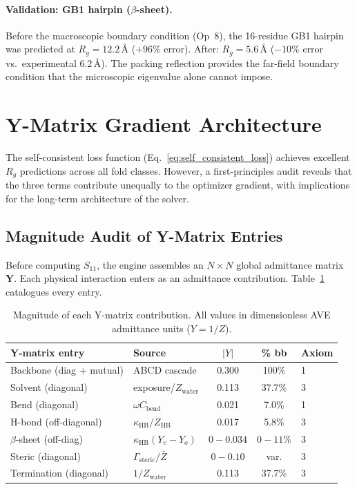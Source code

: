 \paragraph{Validation: GB1 hairpin ($\beta$-sheet).}
Before the macroscopic boundary condition (Op~8), the 16-residue
GB1 hairpin was predicted at $R_g = 12.2$\,\AA{} ($+96\%$ error).
After: $R_g = 5.6$\,\AA{} ($-10\%$ error vs.\ experimental 6.2\,\AA).
The packing reflection provides the far-field boundary condition
that the microscopic eigenvalue alone cannot impose.


\section{Y-Matrix Gradient Architecture}
\label{sec:ymatrix_gradient}

The self-consistent loss function (Eq.~\ref{eq:self_consistent_loss})
achieves excellent $R_g$ predictions across all fold classes.  However,
a first-principles audit reveals that the three terms contribute
unequally to the optimizer gradient, with implications for the long-term
architecture of the solver.

\subsection{Magnitude Audit of Y-Matrix Entries}
\label{sec:ymatrix_audit}

Before computing $S_{11}$, the engine assembles an $N \times N$
global admittance matrix $\mathbf{Y}$.  Each physical interaction enters
as an admittance contribution.  Table~\ref{tab:ymatrix_magnitude}
catalogues every entry.

\begin{table}[H]
\centering
\caption{Magnitude of each Y-matrix contribution.  All values in
dimensionless AVE admittance units ($Y = 1/Z$).}
\label{tab:ymatrix_magnitude}
\small
\begin{tabular}{@{}l l c c l@{}}
\toprule
\textbf{Y-matrix entry} & \textbf{Source} & $|Y|$ & \textbf{\% bb} & \textbf{Axiom} \\
\midrule
Backbone (diag + mutual) & ABCD cascade  & 0.300 & 100\%  & 1 \\
Solvent (diagonal)       & exposure/$Z_\text{water}$ & 0.113 & 37.7\% & 3 \\
Bend (diagonal)          & $\omega C_\text{bend}$ & 0.021 & 7.0\%  & 1 \\
H-bond (off-diagonal)    & $\kappa_\text{HB}/Z_\text{HB}$ & 0.017 & 5.8\% & 3 \\
$\beta$-sheet (off-diag) & $\kappa_\text{HB}(Y_e - Y_o)$ & $0{-}0.034$ & $0{-}11\%$ & 3 \\
Steric (diagonal)        & $\Gamma_\text{steric}/\bar{Z}$ & $0{-}0.10$ & var. & 3 \\
Termination (diagonal)   & $1/Z_\text{water}$ & 0.113 & 37.7\% & 3 \\
\bottomrule
\end{tabular}
\end{table}

